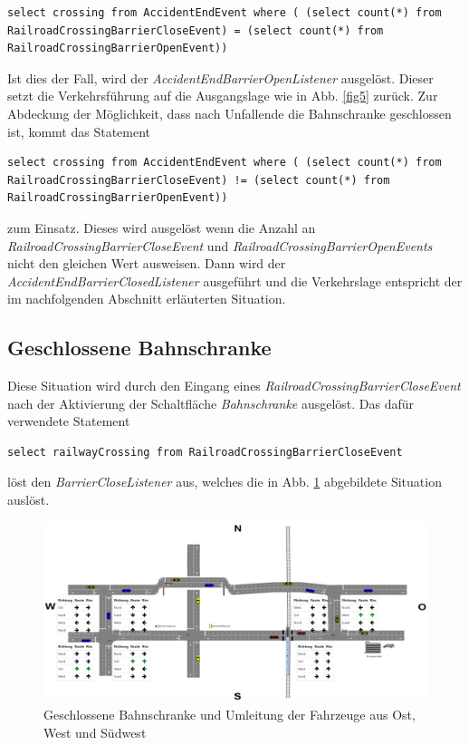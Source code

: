 \begin{lstlisting}
select crossing from AccidentEndEvent where ( (select count(*) from RailroadCrossingBarrierCloseEvent) = (select count(*) from RailroadCrossingBarrierOpenEvent))
\end{lstlisting}

Ist dies der Fall, wird der \textit{AccidentEndBarrierOpenListener} ausgelöst. Dieser setzt die Verkehrsführung auf die Ausgangslage wie in Abb. \ref{fig5} zurück. Zur Abdeckung der Möglichkeit, dass nach Unfallende die Bahnschranke geschlossen ist, kommt das Statement

\begin{lstlisting}
select crossing from AccidentEndEvent where ( (select count(*) from RailroadCrossingBarrierCloseEvent) != (select count(*) from RailroadCrossingBarrierOpenEvent))
\end{lstlisting}

zum Einsatz. Dieses wird ausgelöst wenn die Anzahl an \textit{RailroadCrossingBarrierCloseEvent} und \textit{RailroadCrossingBarrierOpenEvents} nicht den gleichen Wert ausweisen. Dann wird der \textit{AccidentEndBarrierClosedListener} ausgeführt und die Verkehrslage entspricht der im nachfolgenden Abschnitt erläuterten Situation.

\subsection{Geschlossene Bahnschranke} \label{closedBarrier}

Diese Situation wird durch den Eingang eines \textit{RailroadCrossingBarrierCloseEvent} nach der Aktivierung der Schaltfläche \textit{Bahnschranke} ausgelöst. Das dafür verwendete Statement

\begin{lstlisting}
select railwayCrossing from RailroadCrossingBarrierCloseEvent
\end{lstlisting}

löst den \textit{BarrierCloseListener} aus, welches die in Abb. \ref{fig7} abgebildete Situation auslöst.

\begin{figure}[ht]
	\includegraphics[width=\textwidth]{images/RailroadBarrierClose.png}
	\caption{Geschlossene Bahnschranke und Umleitung der Fahrzeuge aus Ost, West und Südwest}
	\label{fig7}
\end{figure}

